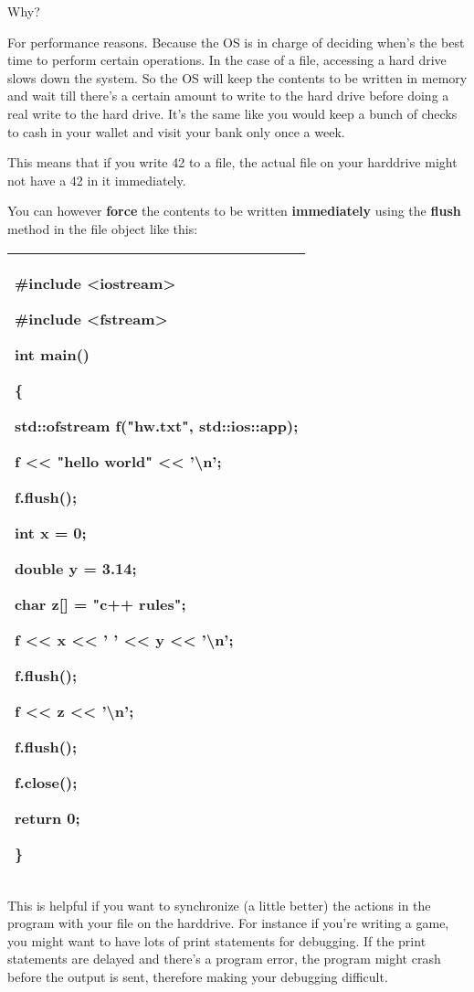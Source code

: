 \documentclass[
]{article}
\begin{document}
Why?

For performance reasons. Because the OS is in charge of deciding when's
the best time to perform certain operations. In the case of a file,
accessing a hard drive slows down the system. So the OS will keep the
contents to be written in memory and wait till there's a certain amount
to write to the hard drive before doing a real write to the hard drive.
It's the same like you would keep a bunch of checks to cash in your
wallet and visit your bank only once a week.

This means that if you write 42 to a file, the actual file on your
harddrive might not have a 42 in it immediately.

You can however \textbf{force} the contents to be written
\textbf{immediately} using the \textbf{flush} method in the file object
like this:

\begin{longtable}[]{@{}l@{}}
\toprule
\endhead
\begin{minipage}[t]{0.97\columnwidth}\raggedright
\#include \textless iostream\textgreater{}

\#include \textless fstream\textgreater{}

int main()

\{

std::ofstream f("hw.txt", std::ios::app);

f \textless\textless{} "hello world" \textless\textless{}
'\textbackslash n';

\textbf{f.flush()};

int x = 0;

double y = 3.14;

char z{[}{]} = "c++ rules";

f \textless\textless{} x \textless\textless{} ' ' \textless\textless{} y
\textless\textless{} '\textbackslash n';

\textbf{f.flush()};

f \textless\textless{} z \textless\textless{} '\textbackslash n';

\textbf{f.flush()};

f.close();

return 0;

\}\strut
\end{minipage}\tabularnewline
\bottomrule
\end{longtable}

This is helpful if you want to synchronize (a little better) the actions
in the program with your file on the harddrive. For instance if you're
writing a game, you might want to have lots of print statements for
debugging. If the print statements are delayed and there's a program
error, the program might crash before the output is sent, therefore
making your debugging difficult.
\end{document}
